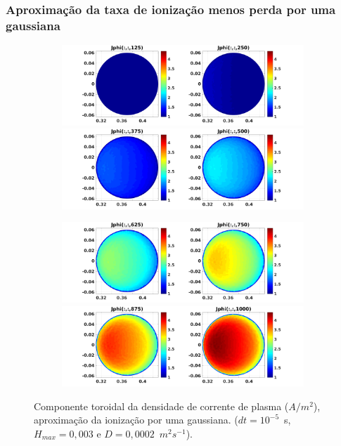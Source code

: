 \documentclass[aspectratio=169]{beamer}
\begin{document}
\begin{frame}
\frametitle{Aproximação da taxa de ionização menos perda por uma gaussiana}
\begin{figure}[H]
\begin{subfigure}{0.43\textwidth}
\includegraphics[scale=0.24]{../SImulacao_breakdown/PDE/Jphitod1B6.png}  
\includegraphics[scale=0.24]{../SImulacao_breakdown/PDE/Jphitod2B6.png} 
\end{subfigure}
\begin{subfigure}{0.43\textwidth}
\includegraphics[scale=0.24]{../SImulacao_breakdown/PDE/Jphitod3B6.png} 
\includegraphics[scale=0.24]{../SImulacao_breakdown/PDE/Jphitod4B6.png} 
\end{subfigure}
\caption{Componente toroidal da densidade de corrente de plasma ($A/m^2$), aproximação da ionização por uma gaussiana. ($dt=10^{-5}$\ s, $H_{max} = 0,003$ e $D=0,0002$\ $m^2s^{-1}$).}
\label{densidadeCB}
\end{figure}
\end{frame}
\end{document}
